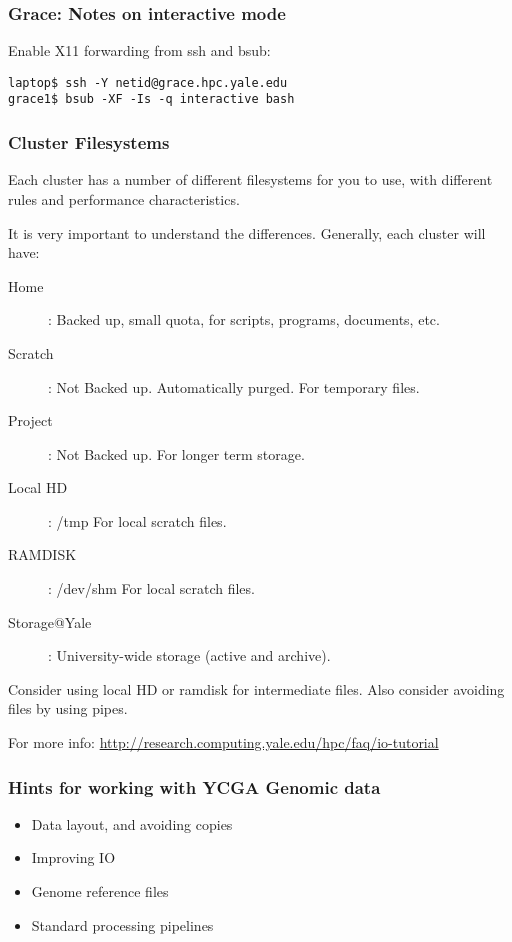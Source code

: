 \documentclass[10pt]{beamer}
\begin{document}
\begin{frame}[fragile]
\frametitle{Grace: Notes on interactive mode}
Enable X11 forwarding from ssh and bsub:
\begin{verbatim}
laptop$ ssh -Y netid@grace.hpc.yale.edu
grace1$ bsub -XF -Is -q interactive bash
\end{verbatim}
\end{frame}

\begin{frame}[fragile]
\frametitle{Cluster Filesystems}
Each cluster has a number of different filesystems for you to use, with different
rules and performance characteristics.  

\vskip10pt

It is very important to understand the differences.  Generally, each cluster will have:

\begin{description}
\item[Home]: Backed up, small quota, for scripts, programs, documents, etc.
\item[Scratch]: Not Backed up.  Automatically purged.  For temporary files.
\item[Project]: Not Backed up.  For longer term storage.
\item[Local HD]: /tmp  For local scratch files.
\item[RAMDISK]: /dev/shm For local scratch files.
\item[Storage@Yale]: University-wide storage (active and archive).
\end{description}

Consider using local HD or ramdisk for intermediate files.  Also consider avoiding files by using pipes.

For more info: \url{http://research.computing.yale.edu/hpc/faq/io-tutorial}

\end{frame}

\begin{frame}[fragile]
\frametitle{Hints for working with YCGA Genomic data}
\begin{itemize}
\item Data layout, and avoiding copies
\item Improving IO
\item Genome reference files
\item Standard processing pipelines
\end{itemize}
\end{frame}
\end{document}
